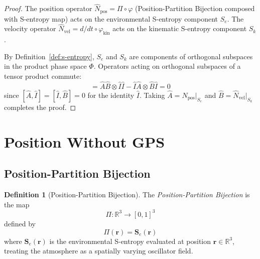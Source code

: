 \documentclass[twocolumn,10pt]{article}
\theoremstyle{definition}
\newtheorem{definition}[theorem]{Definition}
\theoremstyle{remark}
\newcommand{\Sent}{\mathbf{S}}
\newcommand{\R}{\mathbb{R}}
\begin{document}
\begin{proof}
The position operator $\hat{N}_{\mathrm{pos}} = \Pi \circ \varphi$
(Position-Partition Bijection composed with S-entropy map) acts on the
environmental S-entropy component $S_e$. The velocity operator
$\hat{N}_{\mathrm{vel}} = d/dt \circ \varphi_{\mathrm{kin}}$ acts on the
kinematic S-entropy component $S_k$.

By Definition~\ref{def:s-entropy}, $S_e$ and $S_k$ are components of
orthogonal subspaces in the product phase space $\Phi$. Operators acting
on orthogonal subspaces of a tensor product commute:
\begin{equation}
  [\hat{A} \otimes \hat{I}, \hat{I} \otimes \hat{B}]
  = \hat{A}\hat{B} \otimes \hat{I}\hat{I}
  - \hat{I}\hat{A} \otimes \hat{B}\hat{I} = 0
\end{equation}
since $[\hat{A}, \hat{I}] = [\hat{I}, \hat{B}] = 0$ for the identity
$\hat{I}$. Taking $\hat{A} = \hat{N}_{\mathrm{pos}}|_{S_e}$ and
$\hat{B} = \hat{N}_{\mathrm{vel}}|_{S_k}$ completes the proof.
\end{proof}


\section{Position Without GPS}\label{sec:position}

\subsection{Position-Partition Bijection}

\begin{definition}[Position-Partition Bijection]\label{def:position-partition}
The \emph{Position-Partition Bijection} is the map
\begin{equation}\label{eq:position-partition}
  \Pi: \R^3 \to [0,1]^3
\end{equation}
defined by
\begin{equation}\label{eq:pi-def}
  \Pi(\mathbf{r}) = \Sent_e(\mathbf{r})
\end{equation}
where $\Sent_e(\mathbf{r})$ is the environmental S-entropy evaluated at
position $\mathbf{r} \in \R^3$, treating the atmosphere as a spatially
varying oscillator field.
\end{definition}
\end{document}
